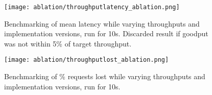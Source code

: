 \begin{figure}[h!]
\centering
\texttt{[image: ablation/throughputlatency\_ablation.png]}
\caption{Benchmarking of mean latency while varying throughputs and implementation versions, run for 10s. Discarded result if goodput was not within 5\% of target throughput.}
\end{figure}

\begin{figure}[h!]
\centering
\texttt{[image: ablation/throughputlost\_ablation.png]}
\caption{Benchmarking of \% requests lost while varying throughputs and implementation versions, run for 10s.}
\end{figure}